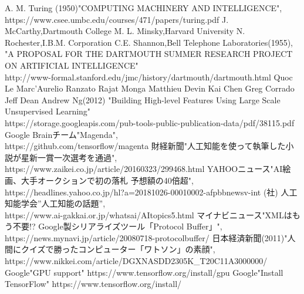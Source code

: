 \documentclass[12pt]{jreport}
\begin{document}
\begin{thebibliography}{99}%



A. M. Turing (1950)"COMPUTING MACHINERY AND INTELLIGENCE",\\
https://www.csee.umbc.edu/courses/471/papers/turing.pdf
J. McCarthy,Dartmouth College M. L. Minsky,Harvard University N.\\
Rochester,I.B.M. Corporation C.E. Shannon,Bell Telephone Laboratories(1955),
"A PROPOSAL FOR THE DARTMOUTH SUMMER RESEARCH PROJECT ON ARTIFICIAL INTELLIGENCE"\\
http://www-formal.stanford.edu/jmc/history/dartmouth/dartmouth.html
Quoc Le Marc'Aurelio Ranzato Rajat Monga Matthieu Devin Kai Chen Greg Corrado Jeff Dean Andrew Ng(2012)
"Building High-level Features Using Large Scale Unsupervised Learning"\\
https://storage.googleapis.com/pub-tools-public-publication-data/pdf/38115.pdf
Google Brainチーム"Magenda",\\
https://github.com/tensorflow/magenta
財経新聞"人工知能を使って執筆した小説が星新一賞一次選考を通過",\\
https://www.zaikei.co.jp/article/20160323/299468.html
YAHOOニュース"AI絵画、大手オークションで初の落札 予想額の40倍超",\\
https://headlines.yahoo.co.jp/hl?a=20181026-00010002-afpbbnewsv-int
(社) 人工知能学会”人工知能の話題”,\\
https://www.ai-gakkai.or.jp/whatsai/AItopics5.html
マイナビニュース"XMLはもう不要!? Google製シリアライズツール「Protocol Buffer」",\\
https://news.mynavi.jp/article/20080718-protocolbuffer/
日本経済新聞(2011)"人間にクイズで勝ったコンピューター「ワトソン」の素顔",\\
https://www.nikkei.com/article/DGXNASDD2305K\_T20C11A3000000/
Google"GPU support"
https://www.tensorflow.org/install/gpu
Google"Install TensorFlow"
https://www.tensorflow.org/install/
\end{thebibliography}

\end{document}
